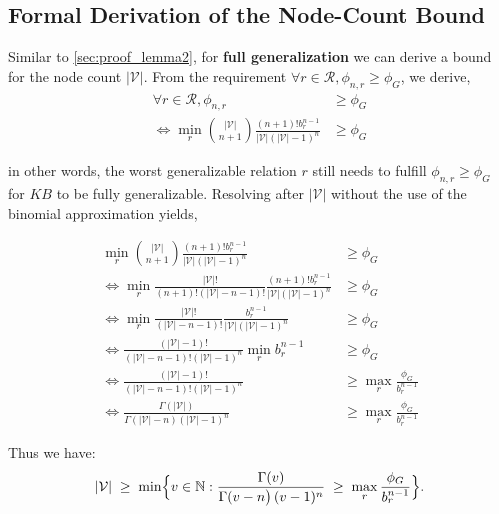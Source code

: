     \subsection{Formal Derivation of the Node-Count Bound}\label{sec:appendix_boundNlower}

        Similar to \ref{sec:proof_lemma2}, for \textbf{full generalization} we can derive a bound for the node count $|\mathcal{V}|$. From the requirement $\forall r \in \mathcal{R}, \phi_{n,r}\ge\phi_G$, we derive,
            \begin{align*}
                \forall r \in \mathcal{R}, \phi_{n,r}&\ge\phi_G \\
            \Leftrightarrow \min_r \binom{|\mathcal{V}|}{n+1}\frac{ (n+1)!b_r^{n-1}}{|\mathcal{V}|(|\mathcal{V}|-1)^n} &\geq \phi_G
            \end{align*}
                
        in other words, the worst generalizable relation $r$ still needs to fulfill $\phi_{n,r} \geq \phi_G $ for $KB$ to be fully generalizable.
        Resolving after $|\mathcal{V}|$ without the use of the binomial approximation yields,
        
        \begin{align*}
            \min_r \binom{|\mathcal{V}|}{n+1}\frac{ (n+1)!b_r^{n-1}}{|\mathcal{V}|(|\mathcal{V}|-1)^n} &\geq \phi_G \\
            \Leftrightarrow \min_r \frac{|\mathcal{V}|!}{(n+1)!(|\mathcal{V}|-n-1)!}\frac{ (n+1)!b_r^{n-1}}{|\mathcal{V}|(|\mathcal{V}|-1)^n} &\geq \phi_G \\
            \Leftrightarrow \min_r \frac{|\mathcal{V}|!}{(|\mathcal{V}|-n-1)!}\frac{ b_r^{n-1}}{|\mathcal{V}|(|\mathcal{V}|-1)^n} &\geq \phi_G \\
            \Leftrightarrow \frac{(|\mathcal{V}|-1)!}{(|\mathcal{V}|-n-1)!(|\mathcal{V}|-1)^n} \min_r b_r^{n-1} &\geq \phi_G \\
            \Leftrightarrow \frac{(|\mathcal{V}|-1)!}{(|\mathcal{V}|-n-1)!(|\mathcal{V}|-1)^n}   &\geq \max_r \frac{\phi_G}{b_r^{n-1}} \\
            \Leftrightarrow \frac{\Gamma(|\mathcal{V}|)}{\Gamma(|\mathcal{V}|-n)(|\mathcal{V}|-1)^n}   &\geq \max_r \frac{\phi_G}{b_r^{n-1}}
        \end{align*}


            Thus we have:
            {\small
            \[
            |\mathcal{V}|
            \;\ge\;
            \min\Bigl\{
               v \in \mathbb{N}
               : 
               \frac{\Gamma(v)}{\Gamma(v-n\bigr)\,(v-1)^n}
               \;\ge\;\max_r \frac{\phi_G}{b_r^{n-1}}
            \Bigr\}.
            \]
            }


